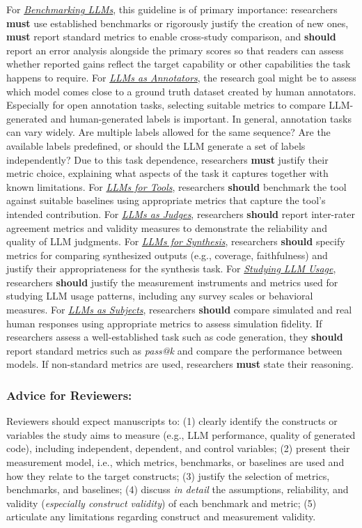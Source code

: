 \documentclass[smallextended]{svjour3}
\newcommand{\must}{\textbf{must}\xspace}
\newcommand{\should}{\textbf{should}\xspace}
\newcommand{\annotators}{\hyperref[sec:llms-as-annotators]{\emph{LLMs as Annotators}}\xspace}
\newcommand{\judges}{\hyperref[sec:llms-as-judges]{\emph{LLMs as Judges}}\xspace}
\newcommand{\synthesis}{\hyperref[sec:llms-for-synthesis]{\emph{LLMs for Synthesis}}\xspace}
\newcommand{\subjects}{\hyperref[sec:llms-as-subjects]{\emph{LLMs as Subjects}}\xspace}
\newcommand{\llmusage}{\hyperref[sec:studying-llm-usage-in-software-engineering]{\emph{Studying LLM Usage}}\xspace}
\newcommand{\newtools}{\hyperref[sec:llms-for-new-software-engineering-tools]{\emph{LLMs for Tools}}\xspace}
\newcommand{\benchmarkingtasks}{\hyperref[sec:benchmarking-llms-for-software-engineering-tasks]{\emph{Benchmarking LLMs}}\xspace}
\newcommand{\annotators}{\href{/study-types\#llms-as-annotators}{\emph{LLMs as Annotators}}\xspace}
\newcommand{\judges}{\href{/study-types\#llms-as-judges}{\emph{LLMs as Judges}}\xspace}
\newcommand{\synthesis}{\href{/study-types\#llms-for-synthesis}{\emph{LLMs for Synthesis}}\xspace}
\newcommand{\subjects}{\href{/study-types\#llms-as-subjects}{\emph{LLMs as Subjects}}\xspace}
\newcommand{\llmusage}{\href{/study-types\#studying-llm-usage-in-software-engineering}{\emph{Studying LLM Usage}}\xspace}
\newcommand{\newtools}{\href{/study-types\#llms-for-new-software-engineering-tools}{\emph{LLMs for Tools}}\xspace}
\newcommand{\benchmarkingtasks}{\href{/study-types\#benchmarking-llms-for-software-engineering-tasks}{\emph{Benchmarking LLMs}}\xspace}
\newcommand{\guidelinesubsubsection}[1]{\subsubsection{\bfseries #1:}}
\newcommand{\guidelinesubsubsection}[1]{\subsubsection{#1}}
\begin{document}
For \benchmarkingtasks, this guideline is of primary importance: researchers \must use established benchmarks or rigorously justify the creation of new ones, \must report standard metrics to enable cross-study comparison, and \should report an error analysis alongside the primary scores so that readers can assess whether reported gains reflect the target capability or other capabilities the task happens to require.
For \annotators, the research goal might be to assess which model comes close to a ground truth dataset created by human annotators.
Especially for open annotation tasks, selecting suitable metrics to compare LLM-generated and human-generated labels is important.
In general, annotation tasks can vary widely.
Are multiple labels allowed for the same sequence? Are the available labels predefined, or should the LLM generate a set of labels independently?
Due to this task dependence, researchers \must justify their metric choice, explaining what aspects of the task it captures together with known limitations.
For \newtools, researchers \should benchmark the tool against suitable baselines using appropriate metrics that capture the tool's intended contribution.
For \judges, researchers \should report inter-rater agreement metrics and validity measures to demonstrate the reliability and quality of LLM judgments.
For \synthesis, researchers \should specify metrics for comparing synthesized outputs (e.g., coverage, faithfulness) and justify their appropriateness for the synthesis task.
For \llmusage, researchers \should justify the measurement instruments and metrics used for studying LLM usage patterns, including any survey scales or behavioral measures.
For \subjects, researchers \should compare simulated and real human responses using appropriate metrics to assess simulation fidelity.
If researchers assess a well-established task such as code generation, they \should report standard metrics such as \emph{pass@k} and compare the performance between models.
If non-standard metrics are used, researchers \must state their reasoning.

\guidelinesubsubsection{Advice for Reviewers}

Reviewers should expect manuscripts to:
(1) clearly identify the constructs or variables the study aims to measure (e.g., LLM performance, quality of generated code), including independent, dependent, and control variables;
(2) present their measurement model, i.e., which metrics, benchmarks, or baselines are used and how they relate to the target constructs;
(3) justify the selection of metrics, benchmarks, and baselines;
(4) discuss \textit{in detail} the assumptions, reliability, and validity (\textit{especially construct validity}) of each benchmark and metric;
(5) articulate any limitations regarding construct and measurement validity.
\end{document}
